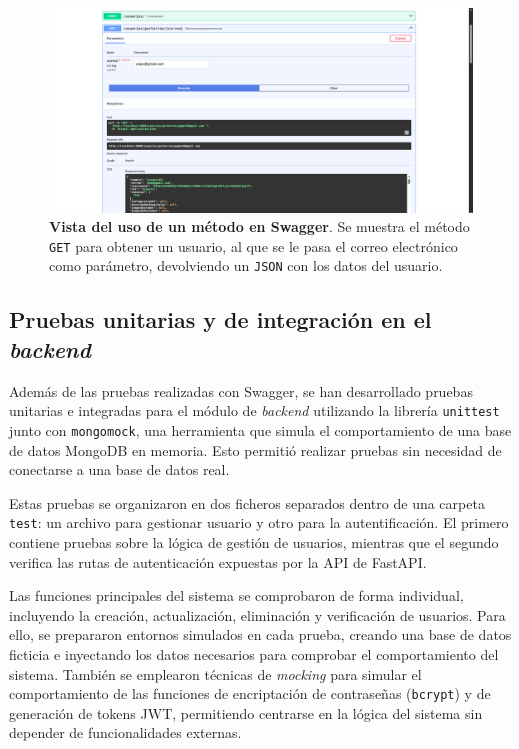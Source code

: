 \begin{figure}[H]
	\centering
	\includegraphics[width=1\linewidth]{imagenes/swagger2.png}
	\caption[\textbf{Vista del uso de un método en Swagger}.]{\textbf{Vista del uso de un método en Swagger}. Se muestra el método \texttt{GET} para obtener un usuario, al que se le pasa el correo electrónico como parámetro, devolviendo un \texttt{JSON} con los datos del usuario.}
	\label{swagger-2}
\end{figure}

\subsection{Pruebas unitarias y de integración en el \textit{backend}}

Además de las pruebas realizadas con Swagger, se han desarrollado pruebas unitarias e integradas para el módulo de \textit{backend} utilizando la librería \texttt{unittest} junto con \texttt{mongomock}, una herramienta que simula el comportamiento de una base de datos MongoDB en memoria. Esto permitió realizar pruebas sin necesidad de conectarse a una base de datos real.

Estas pruebas se organizaron en dos ficheros separados dentro de una carpeta \texttt{test}: un archivo para gestionar usuario y otro para la autentificación. El primero contiene pruebas sobre la lógica de gestión de usuarios, mientras que el segundo verifica las rutas de autenticación expuestas por la API de FastAPI.

Las funciones principales del sistema se comprobaron de forma individual, incluyendo la creación, actualización, eliminación y verificación de usuarios. Para ello, se prepararon entornos simulados en cada prueba, creando una base de datos ficticia e inyectando los datos necesarios para comprobar el comportamiento del sistema. También se emplearon técnicas de \textit{mocking} para simular el comportamiento de las funciones de encriptación de contraseñas (\texttt{bcrypt}) y de generación de tokens JWT, permitiendo centrarse en la lógica del sistema sin depender de funcionalidades externas.

